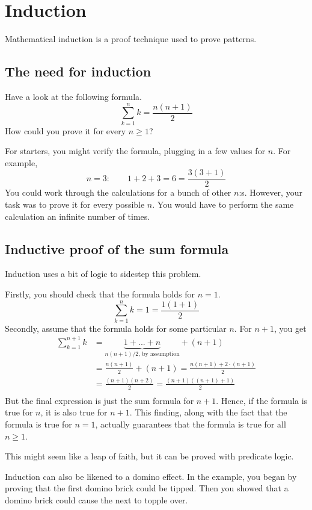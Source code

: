 \documentclass{scrreprt}
\begin{document}
\section*{Induction}
Mathematical induction is a proof technique used to prove patterns.

\subsection*{The need for induction}
Have a look at the following formula.
$$\sum_{k = 1}^n k = \frac{n(n + 1)}{2}$$
How could you prove it for every $n \geq 1$?

For starters, you might verify the formula, plugging in a few values for $n$. For example,
$$n = 3: \qquad 1 + 2 + 3 = 6 = \frac{3(3 + 1)}{2}$$
You could work through the calculations for a bunch of other $n$:s. However, your task was to prove it for every possible $n$. You would have to perform the same calculation an infinite number of times.

\subsection*{Inductive proof of the sum formula}
Induction uses a bit of logic to sidestep this problem.

Firstly, you should check that the formula holds for $n = 1$.
$$\sum_{k = 1}^n k = 1 = \frac{1(1 + 1)}{2}$$
Secondly, assume that the formula holds for some particular $n$. For $n + 1$, you get
\begin{align*}
    \sum_{k = 1}^{n + 1} k &= \underbrace{1 + ... + n}_{n(n + 1)/2 \text{, by assumption}} + (n + 1) \\
    &= \frac{n(n + 1)}{2} + (n + 1) = \frac{n(n + 1) + 2 \cdot (n + 1)}{2}\\
    &= \frac{(n + 1)(n + 2)}{2} = \frac{(n + 1)((n + 1) + 1)}{2} \\
\end{align*}
But the final expression is just the sum formula for $n + 1$. Hence, if the formula is true for $n$, it is also true for $n + 1$. This finding, along with the fact that the formula is true for $n = 1$, actually guarantees that the formula is true for all $n \geq 1$.

This might seem like a leap of faith, but it can be proved with predicate logic.

Induction can also be likened to a domino effect.  In the example, you began by proving that the first domino brick could be tipped. Then you showed that a domino brick could cause the next to topple over.
\end{document}
